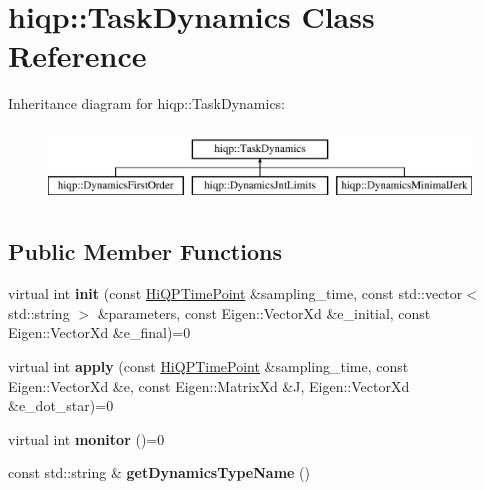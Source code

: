 \hypertarget{classhiqp_1_1TaskDynamics}{\section{hiqp\-:\-:Task\-Dynamics Class Reference}
\label{classhiqp_1_1TaskDynamics}
}
Inheritance diagram for hiqp\-:\-:Task\-Dynamics\-:\begin{figure}[H]
\begin{center}
\leavevmode
\includegraphics[height=2.000000cm]{classhiqp_1_1TaskDynamics}
\end{center}
\end{figure}
\subsection*{Public Member Functions}
\begin{DoxyCompactItemize}
\item 
\hypertarget{classhiqp_1_1TaskDynamics_a40d177e44645d0188f44788bde0adba0}{virtual int {\bfseries init} (const \hyperlink{classhiqp_1_1HiQPTimePoint}{Hi\-Q\-P\-Time\-Point} \&sampling\-\_\-time, const std\-::vector$<$ std\-::string $>$ \&parameters, const Eigen\-::\-Vector\-Xd \&e\-\_\-initial, const Eigen\-::\-Vector\-Xd \&e\-\_\-final)=0}\label{classhiqp_1_1TaskDynamics_a40d177e44645d0188f44788bde0adba0}

\item 
\hypertarget{classhiqp_1_1TaskDynamics_a12685734a0307147bcc453bd315a32f0}{virtual int {\bfseries apply} (const \hyperlink{classhiqp_1_1HiQPTimePoint}{Hi\-Q\-P\-Time\-Point} \&sampling\-\_\-time, const Eigen\-::\-Vector\-Xd \&e, const Eigen\-::\-Matrix\-Xd \&J, Eigen\-::\-Vector\-Xd \&e\-\_\-dot\-\_\-star)=0}\label{classhiqp_1_1TaskDynamics_a12685734a0307147bcc453bd315a32f0}

\item 
\hypertarget{classhiqp_1_1TaskDynamics_a1ab7af71fd1774068e540656dc00af49}{virtual int {\bfseries monitor} ()=0}\label{classhiqp_1_1TaskDynamics_a1ab7af71fd1774068e540656dc00af49}

\item 
\hypertarget{classhiqp_1_1TaskDynamics_a68dc5c02721b9665bb5e49a8a0a5cadc}{const std\-::string \& {\bfseries get\-Dynamics\-Type\-Name} ()}\label{classhiqp_1_1TaskDynamics_a68dc5c02721b9665bb5e49a8a0a5cadc}

\end{DoxyCompactItemize}
